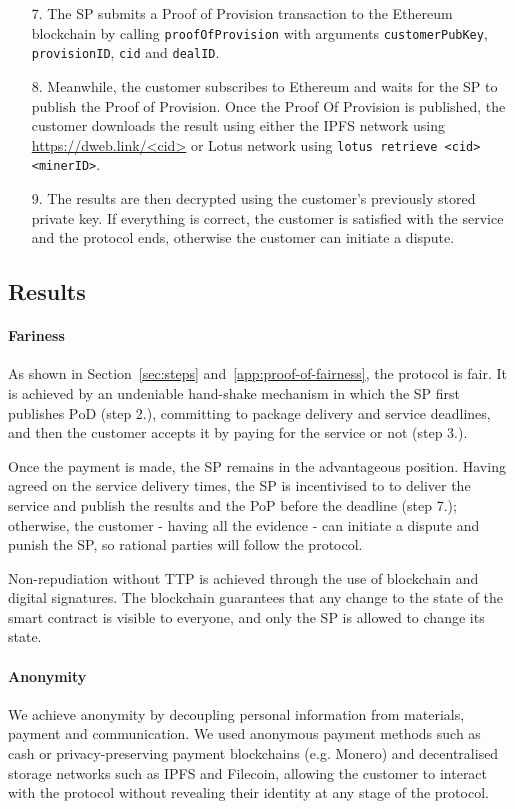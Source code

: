 \documentclass[pdftex,twocolumn,epjc3]{svjour3}
\begin{document}
{\begin{enumerate}
  \item[7.] The SP submits a Proof of Provision transaction to the Ethereum blockchain by calling \texttt{proofOfProvision} with arguments \texttt{customer\-PubKey}, \texttt{provisionID}, \texttt{cid} and \texttt{dealID}.

  \item[8.] Meanwhile, the customer subscribes to Ethereum and waits for the SP to publish the Proof of Provision.
 Once the Proof Of Provision is published, the customer downloads the result using either the IPFS network using \url{https://dweb.link/<cid>} or Lotus network using \texttt{lotus retrieve <cid> <minerID>}. 
 
  \item[9.] The results are then decrypted using the customer's previously stored private key. If everything is correct, the customer is satisfied with the service and the protocol ends, otherwise the customer can initiate a dispute.

\end{enumerate}

\subsection{Results}

\paragraph{Fariness}
As shown in Section~\ref{sec:steps} and~\ref{app:proof-of-fairness}, 
the protocol is fair. It is achieved by an undeniable hand-shake mechanism in which the SP first publishes $\mathrm{PoD}$ (step 2.), committing to package delivery and service deadlines, and then the customer accepts it by paying for the service or not (step 3.).

Once the payment is made, the SP remains in the advantageous position. Having agreed on the service delivery times, the SP is incentivised to to deliver the service and publish the results and the PoP before the deadline (step 7.); otherwise, the customer - having all the evidence - can initiate a dispute and punish the SP, so rational parties will follow the protocol.

Non-repudiation without TTP is achieved through the use of blockchain and digital signatures. The blockchain guarantees that any change to the state of the smart contract is visible to everyone, and only the SP is allowed to change its state. 

\paragraph{Anonymity}
We achieve anonymity by decoupling personal information from materials, payment and communication. We used anonymous payment methods such as cash or privacy-preserving payment blockchains (e.g. Monero) and decentralised storage networks such as IPFS and Filecoin, allowing the customer to interact with the protocol without revealing their identity at any stage of the protocol.

}
\end{document}
